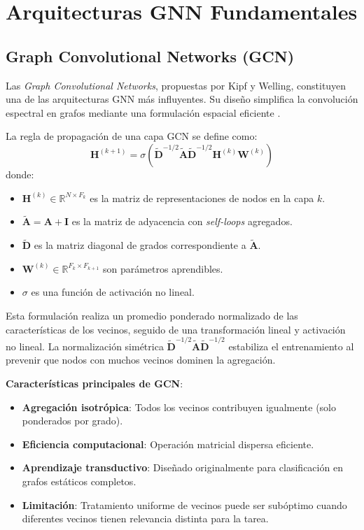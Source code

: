 \section{Arquitecturas GNN Fundamentales}

\subsection{Graph Convolutional Networks (GCN)}

Las \textit{Graph Convolutional Networks}, propuestas por Kipf y Welling, constituyen una de las arquitecturas GNN más influyentes. Su diseño simplifica la convolución espectral en grafos mediante una formulación espacial eficiente \cite{Kipf2017Semi-SupervisedNetworks}.

La regla de propagación de una capa GCN se define como:
\[ \mathbf{H}^{(k+1)} = \sigma(\tilde{\mathbf{D}}^{-1/2} \tilde{\mathbf{A}} \tilde{\mathbf{D}}^{-1/2} \mathbf{H}^{(k)} \mathbf{W}^{(k)}) \]
donde:
\begin{itemize}
    \item $\mathbf{H}^{(k)} \in \mathbb{R}^{N \times F_k}$ es la matriz de representaciones de nodos en la capa $k$.
    \item $\tilde{\mathbf{A}} = \mathbf{A} + \mathbf{I}$ es la matriz de adyacencia con \textit{self-loops} agregados.
    \item $\tilde{\mathbf{D}}$ es la matriz diagonal de grados correspondiente a $\tilde{\mathbf{A}}$.
    \item $\mathbf{W}^{(k)} \in \mathbb{R}^{F_k \times F_{k+1}}$ son parámetros aprendibles.
    \item $\sigma$ es una función de activación no lineal.
\end{itemize}

Esta formulación realiza un promedio ponderado normalizado de las características de los vecinos, seguido de una transformación lineal y activación no lineal. La normalización simétrica $\tilde{\mathbf{D}}^{-1/2} \tilde{\mathbf{A}} \tilde{\mathbf{D}}^{-1/2}$ estabiliza el entrenamiento al prevenir que nodos con muchos vecinos dominen la agregación.

\textbf{Características principales de GCN}:
\begin{itemize}
    \item \textbf{Agregación isotrópica}: Todos los vecinos contribuyen igualmente (solo ponderados por grado).
    \item \textbf{Eficiencia computacional}: Operación matricial dispersa eficiente.
    \item \textbf{Aprendizaje transductivo}: Diseñado originalmente para clasificación en grafos estáticos completos.
    \item \textbf{Limitación}: Tratamiento uniforme de vecinos puede ser subóptimo cuando diferentes vecinos tienen relevancia distinta para la tarea.
\end{itemize}

